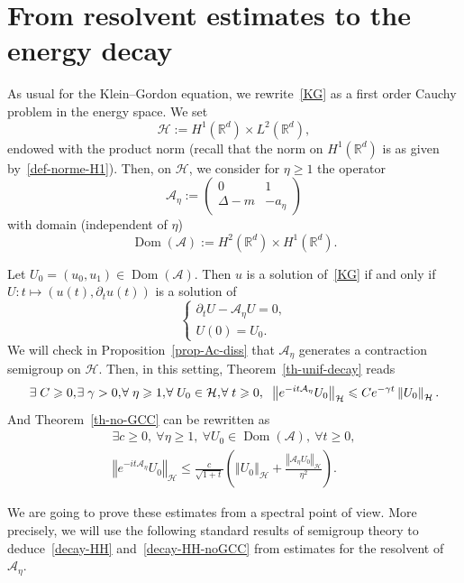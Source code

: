 \documentclass[11pt]{article}
\theoremstyle{definition}
\numberwithin{equation}{section}
\numberwithin{figure}{section}
\numberwithin{table}{section}
\newcommand{\nr}[1]{\left\Vert #1\right\Vert}
\renewcommand{\leq}{\leqslant}
\renewcommand{\geq}{\geqslant}
\newcommand{\1}{\mathds 1}
\DeclareMathOperator{\Dom}{Dom}
\newcommand{\R}{\mathbb{R}}
\newcommand{\g}{\gamma}
\newcommand{\D}{\Delta}
\newcommand{\Ac}{{\mathcal A}}
\newcommand{\HH}{\mathcal H}
\newcommand*{\Mk}{\mkern -2mu}
\let\oldexists\exists
\renewcommand*{\exists}{\mathrel{\oldexists}}
\let\oldforall\forall
\renewcommand*{\forall}{\mathrel{\oldforall}}
\begin{document}
\section{From resolvent estimates to the energy decay} \label{sec-resolvent-to-time}

As usual for the Klein--Gordon equation, we rewrite~\eqref{KG} as a first order Cauchy problem in the energy space. We set
\[
\HH := H^1(\R^d) \times L^2(\R^d),
\]
endowed with the product norm (recall that the norm on $H^1(\R^d)$ is as given by~\eqref{def-norme-H1}). Then, on $\HH$, we consider for $\eta \geq 1$ the operator
\[
\Ac_\eta :=
\begin{pmatrix}
0 & 1 \\
\D - m & -a_\eta
\end{pmatrix}
\]
with domain (independent of $\eta$)
\[
\Dom(\Ac) := H^2(\R^d) \times H^1(\R^d).
\]

Let $U_0 = (u_0,u_1) \in \Dom(\Ac)$. Then $u$ is a solution of~\eqref{KG} if and only if $U : t \mapsto (u(t),\partial_t u(t))$ is a solution of
\begin{equation}\label{KG-Ac}
\begin{cases}
\partial_t U - \Ac_\eta U = 0,\\
U(0) = U_0.
\end{cases}
\end{equation}
We will check in Proposition~\ref{prop-Ac-diss} that $\Ac_\eta$ generates a contraction semigroup on $\HH$. Then, in this setting, Theorem~\ref{th-unif-decay} reads
\begin{equation}\label{decay-HH}
\exists C \geq 0,\Mk \exists \gamma > 0,\Mk \forall \eta \geq 1,\Mk \forall U_0 \in \HH,\Mk \forall t \geq 0, \;\; \nr{e^{-it\Ac_\eta} U_0}_{\HH} \leq C e^{-\g t} \nr{U_0}_{\HH}.
\end{equation}
And Theorem~\ref{th-no-GCC} can be rewritten as
\begin{multline}\label{decay-HH-noGCC}
\exists c \geq 0,\ \forall \eta \geq 1,\ \forall U_0 \in \Dom(\Ac),\ \forall t \geq 0,
\\ \nr{e^{-it\Ac_\eta} U_0}_{\HH} \leq \frac c {\sqrt{1+t}} \left(\nr{U_0}_\HH + \frac {\nr{\Ac_\eta U_0}_{\HH}}{\eta^2} \right).
\end{multline}

We are going to prove these estimates from a spectral point of view. More precisely, we will use the following standard results of semigroup theory to deduce~\eqref{decay-HH} and~\eqref{decay-HH-noGCC} from estimates for the resolvent of $\Ac_\eta$.
\end{document}
